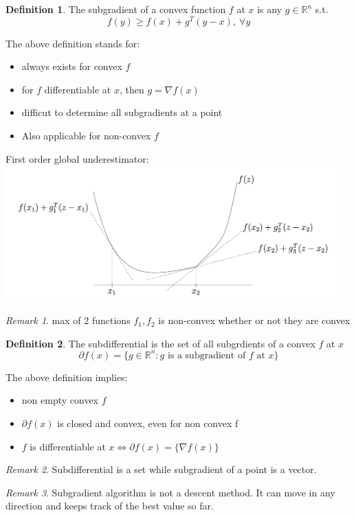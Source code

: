 \documentclass{article}
\theoremstyle{definition}
\newtheorem{definition}{Definition}[section]
\theoremstyle{remark}
\newtheorem*{remark}{Remark}
\newcommand{\pdr}{\partial}
\def\R{\mathbb{R}}
\begin{document}
\begin{definition}
    The subgradient of a convex function $f$ at $x$ is any $g \in \R^n$ s.t.
    $$f(y) \geq f(x) + g^T(y - x),\ \forall y$$
\end{definition}
The above definition stands for:
\begin{itemize}
    \item always exists for convex $f$
    \item for $f$ differentiable at $x$, then $g = \nabla f(x)$
    \item difficut to determine all subgradients at a point
    \item Also applicable for non-convex $f$
\end{itemize}
First order global underestimator:\\
\includegraphics[width=5in]{img/subgradients.png}

\begin{remark}
    max of 2 functions $f_1, f_2$ is non-convex whether or not they are
    convex
\end{remark}

\begin{definition}
    The subdifferential is the set of all subgrdients of a convex $f$ at $x$\\
    $$\pdr f(x) = \{g \in \R^n: g \text{ is a subgradient of } f \text{ at } x\}$$
\end{definition}
The above definition implies:
\begin{itemize}
    \item non empty convex $f$
    \item $\pdr f(x)$ is closed and convex, even for non convex f
    \item $f$ is differentiable at $x \Leftrightarrow \pdr f(x) = \{\nabla f(x)\}$
\end{itemize}
\begin{remark}
    Subdifferential is a set while subgradient of a point is a vector.
\end{remark}
\begin{remark}
    Subgradient algorithm is not a descent method. It can move in any direction and keeps track of the best
    value so far.
\end{remark}
\end{document}
